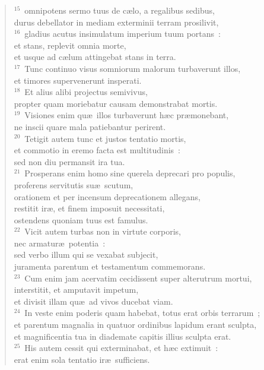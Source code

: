 \begin{verse}
${}^{15}$~omnipotens sermo tuus de c\ae lo, a regalibus sedibus,\\ durus debellator in mediam exterminii terram prosilivit,\\
${}^{16}$~gladius acutus insimulatum imperium tuum portans~:\\ et stans, replevit omnia morte,\\ et usque ad c\ae lum attingebat stans in terra.\\
${}^{17}$~Tunc continuo visus somniorum malorum turbaverunt illos,\\ et timores supervenerunt insperati.\\
${}^{18}$~Et alius alibi projectus semivivus,\\ propter quam moriebatur causam demonstrabat mortis.\\
${}^{19}$~Visiones enim qu\ae\ illos turbaverunt h\ae c pr\ae monebant,\\ ne inscii quare mala patiebantur perirent.\\
${}^{20}$~Tetigit autem tunc et justos tentatio mortis,\\ et commotio in eremo facta est multitudinis~:\\ sed non diu permansit ira tua.\\
${}^{21}$~Prosperans enim homo sine querela deprecari pro populis,\\ proferens servitutis su\ae\ scutum,\\ orationem et per incensum deprecationem allegans,\\ restitit ir\ae , et finem imposuit necessitati,\\ ostendens quoniam tuus est famulus.\\
${}^{22}$~Vicit autem turbas non in virtute corporis,\\ nec armatur\ae\ potentia~:\\ sed verbo illum qui se vexabat subjecit,\\ juramenta parentum et testamentum commemorans.\\
${}^{23}$~Cum enim jam acervatim cecidissent super alterutrum mortui,\\ interstitit, et amputavit impetum,\\ et divisit illam qu\ae\ ad vivos ducebat viam.\\
${}^{24}$~In veste enim poderis quam habebat, totus erat orbis terrarum~;\\ et parentum magnalia in quatuor ordinibus lapidum erant sculpta,\\ et magnificentia tua in diademate capitis illius sculpta erat.\\
${}^{25}$~His autem cessit qui exterminabat, et h\ae c extimuit~:\\ erat enim sola tentatio ir\ae\ sufficiens.\end{verse}


